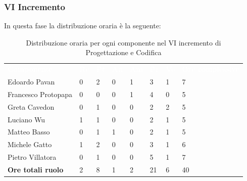 \subsubsection{VI Incremento}
In questa fase la distribuzione oraria è la seguente:
\begin{table}[H]
\begin{center}
\renewcommand{\arraystretch}{1.25}
\begin{tabular}{ m{}<{\centering}  m{}<{\centering} m{}<{\centering} m{}<{\centering}  m{}<{\centering}  m{}<{\centering}  m{}<{\centering}  m{}<{\centering}   }
	\rowcolor{darkblue}
	\textcolor{white}{\textbf{Componente}} &\textcolor{white}{\textbf{Re}}&\textcolor{white}{\textbf{Pt}}&\textcolor{white}{\textbf{An}}&\textcolor{white}{\textbf{Am}}&\textcolor{white}{\textbf{Pr}}&\textcolor{white}{\textbf{Ve}}&\textcolor{white}{\textbf{Ore complessive}}\\ 
	Edoardo Pavan & 0 & 2 & 0 & 1 & 3 & 1 & 7 \\	
	
	Francesco Protopapa & 0 & 0 & 0 & 1 & 4 & 0 & 5 \\

	Greta Cavedon & 0 & 1 & 0 & 0 & 2 & 2 & 5 \\
	
	Luciano Wu & 1 & 1 & 0 & 0 & 2 & 1 & 5 \\
	
	Matteo Basso & 0 & 1 & 1 & 0 & 2 & 1 & 5 \\
	
	Michele Gatto & 1 & 2 & 0 & 0 & 3 & 1 & 6 \\
	
	Pietro Villatora & 0 & 1 & 0 & 0 & 5 & 1 & 7 \\
	
	\textbf{Ore totali ruolo} & 2 & 8 & 1 & 2 & 21 & 6 & 40 \\

\end{tabular}
\caption{Distribuzione oraria per ogni componente nel VI incremento di Progettazione e Codifica}
\end{center}
\end{table}

